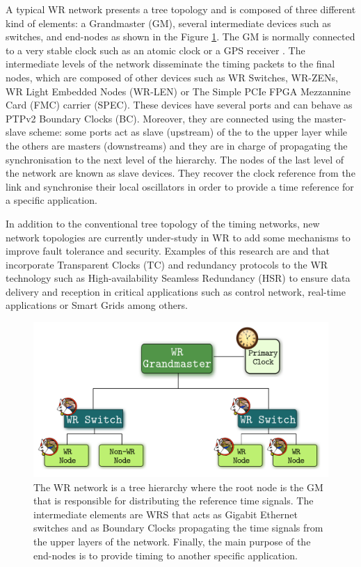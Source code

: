 A typical WR network presents a tree topology and is composed of three different
kind of elements: a Grandmaster (GM), several intermediate devices such as
switches, and end-nodes as shown in the Figure \ref{fig:wr_hierarchy}. The GM
is normally connected to a very stable clock such as an atomic clock or a GPS
receiver \cite{Daniluk2012}. The intermediate levels of the network disseminate
the timing packets to the final nodes, which are composed of other devices such
as WR Switches, WR-ZENs, WR Light Embedded Nodes (WR-LEN) or The Simple PCIe FPGA Mezzannine Card (FMC) carrier (SPEC). These devices have several ports and can behave as PTPv2 Boundary Clocks (BC). Moreover, they are connected using the master-slave scheme: some ports act as slave (upstream) of the to the upper layer while the others are masters (downstreams) and they are in charge of propagating the synchronisation to the next level of the hierarchy. The nodes of the last level of the network are known as slave devices. They recover the clock reference from the link and synchronise their local oscillators in order to provide a time reference for a specific application.

In addition to the conventional tree topology of the timing networks, new
network topologies are currently under-study in WR to add some mechanisms to improve fault
tolerance and security. Examples of this research are
\cite{jlgutierrez-paper-redundancy} and \cite{jlgutierrezhsr} that incorporate Transparent Clocks
(TC) and redundancy protocols to the WR technology such as
High-availability Seamless Redundancy (HSR) to ensure data delivery and reception in critical applications such as
control network, real-time applications or Smart Grids among others.

\begin{figure}[H] \centering \includegraphics[scale=0.4]{img/wr_hierarchy}
	\caption{The WR network is a tree hierarchy where the root node is the
	GM that is responsible for distributing the reference time signals. The
	intermediate elements are WRS that acts as Gigabit Ethernet
	switches and as Boundary Clocks propagating the time signals from the
	upper layers of the network. Finally, the main purpose of the end-nodes
	is to provide timing to another specific application.}
\label{fig:wr_hierarchy} \end{figure}

